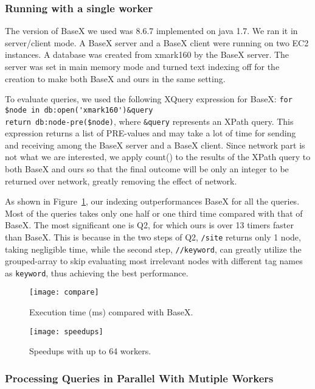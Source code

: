 \subsubsection{Running with a single worker}

The version of BaseX we used was 8.6.7 implemented on java 1.7. We ran it in
server/client mode. A BaseX server and a BaseX client were running on two EC2
instances. A database was created from xmark160 by the BaseX server. The server
was set in main memory mode and turned text indexing off for the creation to
make both BaseX and ours in the same setting.

To evaluate queries, we used the following XQuery expression for BaseX:  
\verb|for $node in db:open('xmark160')&query|\\
\verb|return db:node-pre($node)|, where  \verb|&query|
represents an XPath query. This expression returns a list of PRE-values and may
take a lot of time for sending and receiving among the BaseX server and a BaseX
client. Since network part is not what we are interested, we apply count() to
the results of the XPath query to both BaseX and ours so that the final outcome
will be only an integer to be returned over network, greatly removing the effect
of network.

As shown in Figure~\ref{fig:compare}, our indexing outperformances BaseX for all
the queries. Most of the queries takes only one half or one third time compared
with that of BaseX. The most significant one is Q2, for which ours is over 13
timers faster than BaseX. This is because in the two steps of Q2, \texttt{/site}
returns only 1 node, taking negligible time, while the second step,
\texttt{//keyword}, can greatly utilize the grouped-array to skip evaluating
most irrelevant nodes with different tag names as \texttt{keyword}, thus
achieving the best performance.


\begin{figure}[thb]
	\centering
	\texttt{[image: compare]}
	\label{fig:compare}       %
	\caption{Execution time (ms) compared with BaseX.}
\end{figure}

\begin{figure}[thb]
	\centering
	\texttt{[image: speedups]}
	\caption{Speedups with up to 64 workers.}
	\label{fig:speedups}    
\end{figure}


\subsubsection{Processing Queries in Parallel With Mutiple Workers}


